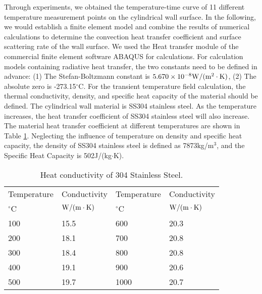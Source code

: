 Through experiments, we obtained the temperature-time curve of 11 different temperature measurement points on the cylindrical wall surface.
In the following, we would establish a finite element model and combine the results of numerical calculations to determine the convection heat transfer coefficient and surface scattering rate of the wall surface.
We used the Heat transfer module of the commercial finite element software ABAQUS for calculations.
For calculation models containing radiative heat transfer, the two constants need to be defined in advance:
(1) The Stefan-Boltzmann constant is $5.670\times10^{-8}\rm{W}/(\rm{m}^{2}\cdot\rm{K})$,
(2) The absolute zero is -273.15$^{\circ}$C.
For the transient temperature field calculation, the thermal conductivity, density, and specific heat capacity of the material should be defined.
The cylindrical wall material is SS304 stainless steel. As the temperature increases, the heat transfer coefficient of SS304 stainless steel will also increase. The material heat transfer coefficient at different temperatures are shown in Table \ref{Tab:SS304HeatTransfer}.
Neglecting the influence of temperature on density and specific heat capacity, the density of SS304 stainless steel is defined as 7873kg/m$^3$, and the Specific Heat Capacity is 502J/(kg$\cdot$K).

\begin{table}[htbp]
  \centering
  \caption{Heat conductivity of 304 Stainless Steel.}
    \begin{tabular}{llll}
    \toprule
    Temperature & Conductivity & Temperature & Conductivity \\
    $^{\circ}$C & ${\rm{W/(m}} \cdot {\rm{K)}}$ & $^{\circ}$C & ${\rm{W/(m}} \cdot {\rm{K)}}$ \\
    \midrule
    100   & 15.5  & 600   & 20.3 \\
    200   & 18.1  & 700   & 20.8 \\
    300   & 18.4  & 800   & 20.8 \\
    400   & 19.1  & 900   & 20.6 \\
    500   & 19.7  & 1000  & 20.7 \\
    \bottomrule
    \end{tabular}%
  \label{Tab:SS304HeatTransfer}%
\end{table}%


